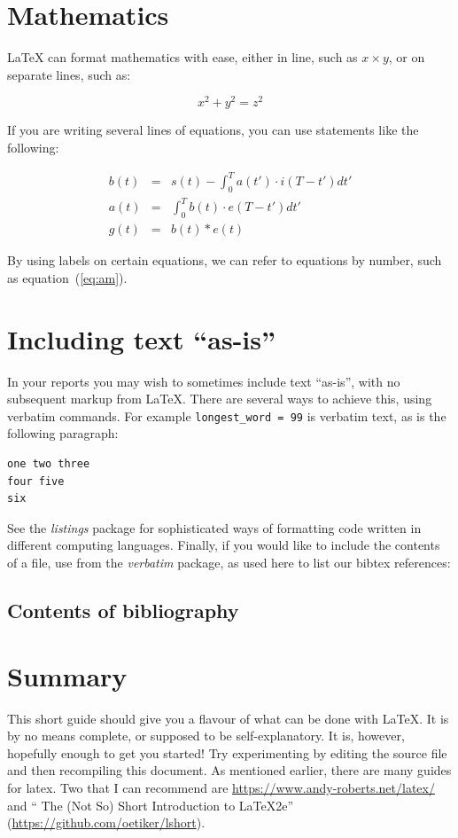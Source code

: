 \documentclass[]{article}
\providecommand*{\latex}{\LaTeX\xspace}
\begin{document}
\section{Mathematics}

\latex can format mathematics with ease, either in line, such as 
$x \times y$, or on separate lines, such as:

\[ x^2 +y^2 = z^2 \]

If you are writing several lines of equations, you can use statements
like the following:

\begin{eqnarray}
  b(t) & = & s(t) - \int_{0}^{T} a(t') \cdot i(T-t') dt'
  \\
  a(t) & = & \int_{0}^{T} b(t) \cdot e(T-t') dt' \label{eq:am}
  \\
  g(t) & = & b(t) \ast e(t) \nonumber
\end{eqnarray}

By using labels on certain equations, we can refer to equations by
number, such as equation~(\ref{eq:am}).

\section{Including text ``as-is''}

In your reports you may wish to sometimes include text ``as-is'', with
no subsequent markup from \latex.  There are several ways to achieve
this, using verbatim commands.  For example \verb+longest_word = 99+
is verbatim text, as is the following paragraph:

\begin{verbatim}
one two three
four five
six
\end{verbatim}

See the \textit{listings} package for sophisticated ways of formatting
code written in different computing languages.  Finally, if you would
like to include the contents of a file, use \verb++from
the \textit{verbatim} package, as used here to list our bibtex
references:

\subsection{Contents of bibliography}



\section{Summary}
\label{sec:summary}
This short guide should give you a flavour of what can be done with
\latex.  It is by no means complete, or supposed to be
self-explanatory.  It is, however, hopefully enough to get you
started!  Try experimenting by editing the source file and then
recompiling this document.  As mentioned earlier, there are many
guides for latex.  Two that I can recommend are
\url{https://www.andy-roberts.net/latex/} and 
`` The (Not So) Short Introduction to LaTeX2e''
(\url{https://github.com/oetiker/lshort}).
\end{document}
